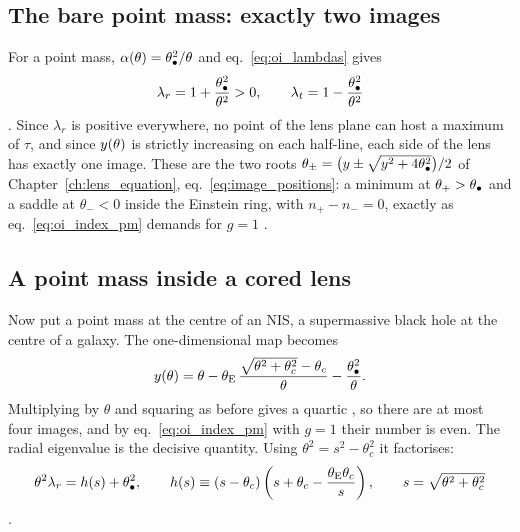 \subsection{The bare point mass: exactly two images}

For a point mass, $\alpha(\theta)=\theta_{\bullet}^2/\theta$ and
eq.~\eqref{eq:oi_lambdas} gives
\begin{equation}
    \lambda_r = 1 + \frac{\theta_{\bullet}^2}{\theta^2} > 0, \qquad
    \lambda_t = 1 - \frac{\theta_{\bullet}^2}{\theta^2}
    \label{eq:oi_pm_lambdas}
\end{equation}
.  Since $\lambda_r$ is positive everywhere, no
point of the lens plane can host a maximum of $\tau$, and since
$y(\theta)$ is strictly increasing on each half-line, each side of
the lens has exactly one image.  These are the two roots
$\theta_\pm=\big(y\pm\sqrt{y^2+4\theta_{\bullet}^2}\big)/2$ of
Chapter~\ref{ch:lens_equation}, eq.~\eqref{eq:image_positions}: a
minimum at $\theta_+>\theta_{\bullet}$ and a saddle at $\theta_-<0$ inside the
Einstein ring, with $n_+-n_-=0$, exactly as eq.~\eqref{eq:oi_index_pm}
demands for $g=1$ .

\subsection{A point mass inside a cored lens}

Now put a point mass at the centre of an NIS, a supermassive black
hole at the centre of a galaxy.  The one-dimensional map becomes
\begin{equation}
    y(\theta) = \theta - \theta_{\mathrm{E}}\,\frac{\sqrt{\theta^2+\theta_c^2}-\theta_c}{\theta}
                   - \frac{\theta_{\bullet}^2}{\theta}.
    \label{eq:oi_nisbh_map}
\end{equation}
Multiplying by $\theta$ and squaring as before gives a quartic , so there are at most four images, and by eq.~\eqref{eq:oi_index_pm}
with $g=1$ their number is even.  The radial eigenvalue is the decisive
quantity.  Using $\theta^2=s^2-\theta_c^2$ it factorises:
\begin{equation}
    \theta^2\lambda_r = h(s) + \theta_{\bullet}^2, \qquad
    h(s) \equiv (s-\theta_c)\left(s+\theta_c-\frac{\theta_{\mathrm{E}}\theta_c}{s}\right),
    \qquad s=\sqrt{\theta^2+\theta_c^2}
    \label{eq:oi_theta2lr}
\end{equation}
.

